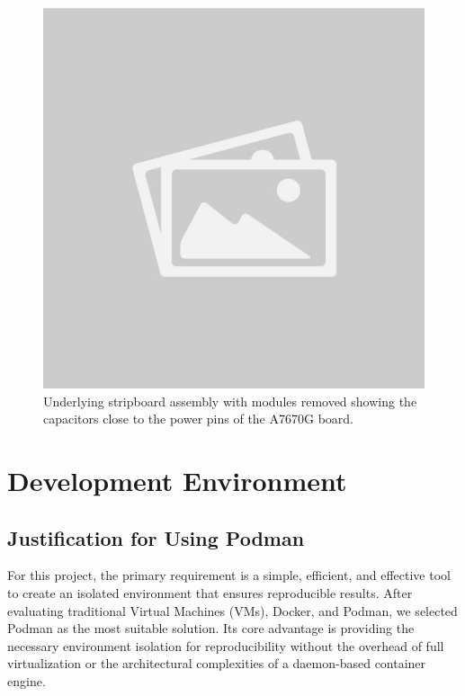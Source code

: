\begin{figure}[H]
\begin{minipage}{0.48\textwidth}
        \includegraphics[width=\linewidth]{placeholder.jpg} %
        \caption{Underlying stripboard assembly with modules removed showing the capacitors close to the power pins of the A7670G board.}
        \label{fig:hardware-photo-caps}
    \end{minipage}
\end{figure}

\section{Development Environment}

\subsection{Justification for Using Podman}

For this project, the primary requirement is a simple, efficient, and effective tool to create an isolated environment that ensures reproducible results. After evaluating traditional Virtual Machines (VMs), Docker, and Podman, we selected Podman as the most suitable solution. Its core advantage is providing the necessary environment isolation for reproducibility without the overhead of full virtualization or the architectural complexities of a daemon-based container engine.

